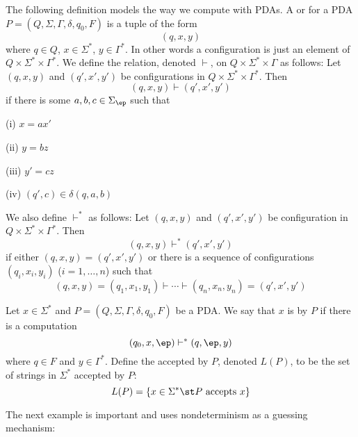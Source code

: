 \begin{defn}
The following definition models the way we compute with PDAs.
A 
or 
for a PDA $P = (Q, \Sigma, \Gamma, \delta, q_0, F)$
is a tuple of the form
\[
(q, x, y)
\]
where $q \in Q$, $x \in \Sigma^*$, $y \in \Gamma^*$.
In other words a configuration is just an element of 
$Q \times \Sigma^* \times \Gamma^*$.
We define the  relation, denoted $\vdash$,
on $Q \times \Sigma^* \times \Gamma$ as follows:
Let $(q, x, y)$ and $(q', x', y')$ be configurations in 
$Q \times \Sigma^* \times \Gamma^*$. Then 
\[
(q, x, y)  \vdash (q', x', y')
\]
if there is some $a, b, c \in \Sigma_\ep$ such that
\begin{mylist}
\item[(i)] $x = ax'$
\item[(ii)] $y = bz$
\item[(iii)] $y' = cz$
\item[(iv)] $(q', c) \in \delta(q, a, b)$
\end{mylist}

We also define $\vdash^*$ as follows: 
Let
$(q, x, y)$ and $(q', x', y')$ be configuration in 
$Q \times \Sigma^* \times \Gamma^*$. 
Then 
\[
(q, x, y)  \vdash^* (q', x', y')
\]
if either $(q, x, y) = (q', x', y')$ or
there is a sequence of configurations $(q_i, x_i, y_i)$
($i = 1, \ldots, n$) such that
\[
(q, x, y)  = (q_1, x_1, y_1) 
\vdash \cdots 
\vdash (q_n, x_n, y_n) = (q', x', y')
\]
\end{defn}

\begin{defn}
Let $x \in \Sigma^*$ and $P = (Q, \Sigma, \Gamma, \delta, q_0, F)$ 
be a PDA. We say that $x$ is  by $P$ if
there is a computation
\[
(q_0, x, \ep) \vdash^* (q, \ep, y)
\]
where $q \in F$ and $y \in \Gamma^*$.
Define the  accepted by $P$, denoted $L(P)$,
to be the set of strings in $\Sigma^*$ accepted by $P$:
\[
L(P) = \{x \in \Sigma^* \st P \text{ accepts } x\}
\]
\end{defn}


\newpage
The next example is important and 
uses nondeterminism as a guessing mechanism:

